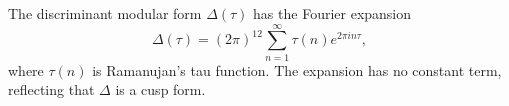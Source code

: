 The discriminant modular form $\Delta(\tau)$ has the Fourier expansion
$$\Delta(\tau) = (2\pi)^{12} \sum_{n=1}^{\infty} \tau(n) e^{2\pi i n \tau},$$
where $\tau(n)$ is Ramanujan's tau function. The expansion has no constant term, reflecting that $\Delta$ is a cusp form.
